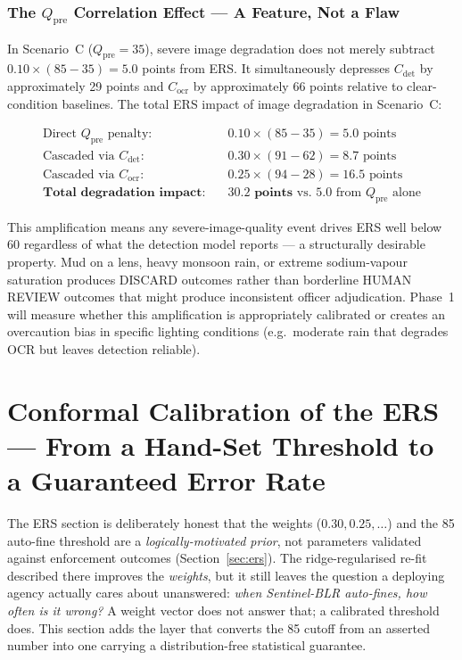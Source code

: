 \documentclass[11pt,a4paper]{article}
\begin{document}
\subsubsection*{The $Q_{\text{pre}}$ Correlation Effect — A Feature, Not a Flaw}

In Scenario~C ($Q_{\text{pre}} = 35$), severe image degradation does not merely subtract $0.10 \times (85 - 35) = 5.0$ points from ERS. It simultaneously depresses $C_{\text{det}}$ by approximately 29 points and $C_{\text{ocr}}$ by approximately 66 points relative to clear-condition baselines. The total ERS impact of image degradation in Scenario~C:

\begin{align*}
\text{Direct } Q_{\text{pre}} \text{ penalty:}& \quad 0.10 \times (85 - 35) = 5.0 \text{ points} \\
\text{Cascaded via } C_{\text{det}}:& \quad 0.30 \times (91 - 62) = 8.7 \text{ points} \\
\text{Cascaded via } C_{\text{ocr}}:& \quad 0.25 \times (94 - 28) = 16.5 \text{ points} \\
\textbf{Total degradation impact:}& \quad \mathbf{30.2 \text{ points}} \text{ vs.\ 5.0 from } Q_{\text{pre}} \text{ alone}
\end{align*}

This amplification means any severe-image-quality event drives ERS well below 60 regardless of what the detection model reports --- a structurally desirable property. Mud on a lens, heavy monsoon rain, or extreme sodium-vapour saturation produces DISCARD outcomes rather than borderline HUMAN REVIEW outcomes that might produce inconsistent officer adjudication. Phase~1 will measure whether this amplification is appropriately calibrated or creates an overcaution bias in specific lighting conditions (e.g.\ moderate rain that degrades OCR but leaves detection reliable).

\section{Conformal Calibration of the ERS — From a Hand-Set Threshold to a Guaranteed Error Rate}
\label{sec:conformal}

\noindent The ERS section is deliberately honest that the weights ($0.30, 0.25, \dots$) and the 85 auto-fine threshold are a \emph{logically-motivated prior}, not parameters validated against enforcement outcomes (Section~\ref{sec:ers}). The ridge-regularised re-fit described there improves the \emph{weights}, but it still leaves the question a deploying agency actually cares about unanswered: \textit{when Sentinel-BLR auto-fines, how often is it wrong?} A weight vector does not answer that; a calibrated threshold does. This section adds the layer that converts the 85 cutoff from an asserted number into one carrying a distribution-free statistical guarantee.
\end{document}
